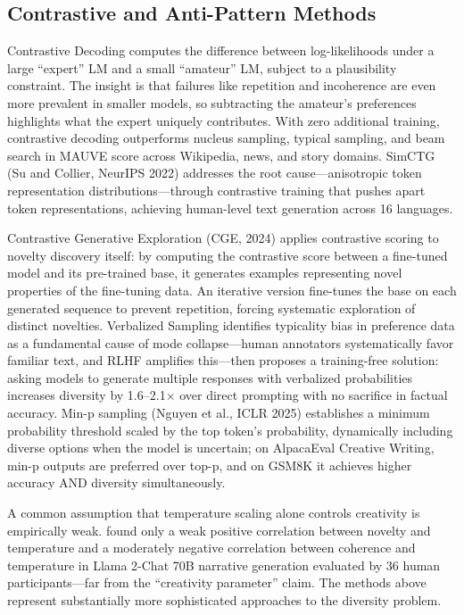 \documentclass[12pt,a4paper]{article}
\begin{document}
\subsection{Contrastive and Anti-Pattern Methods}
Contrastive Decoding \citep{li2023contrastive} computes the difference between log-likelihoods under a large ``expert'' LM and a small ``amateur'' LM, subject to a plausibility constraint. The insight is that failures like repetition and incoherence are even more prevalent in smaller models, so subtracting the amateur's preferences highlights what the expert uniquely contributes. With zero additional training, contrastive decoding outperforms nucleus sampling, typical sampling, and beam search in MAUVE score across Wikipedia, news, and story domains. SimCTG (Su and Collier, NeurIPS 2022) addresses the root cause---anisotropic token representation distributions---through contrastive training that pushes apart token representations, achieving human-level text generation across 16 languages.

Contrastive Generative Exploration (CGE, 2024) applies contrastive scoring to novelty discovery itself: by computing the contrastive score between a fine-tuned model and its pre-trained base, it generates examples representing novel properties of the fine-tuning data. An iterative version fine-tunes the base on each generated sequence to prevent repetition, forcing systematic exploration of distinct novelties. Verbalized Sampling \citep{zhang2025creative} identifies typicality bias in preference data as a fundamental cause of mode collapse---human annotators systematically favor familiar text, and RLHF amplifies this---then proposes a training-free solution: asking models to generate multiple responses with verbalized probabilities increases diversity by 1.6--2.1$\times$ over direct prompting with no sacrifice in factual accuracy. Min-p sampling (Nguyen et al., ICLR 2025) establishes a minimum probability threshold scaled by the top token's probability, dynamically including diverse options when the model is uncertain; on AlpacaEval Creative Writing, min-p outputs are preferred over top-p, and on GSM8K it achieves higher accuracy AND diversity simultaneously.

A common assumption that temperature scaling alone controls creativity is empirically weak. \citet{peeperkorn2024} found only a weak positive correlation between novelty and temperature and a moderately negative correlation between coherence and temperature in Llama 2-Chat 70B narrative generation evaluated by 36 human participants---far from the ``creativity parameter'' claim. The methods above represent substantially more sophisticated approaches to the diversity problem.
\end{document}
